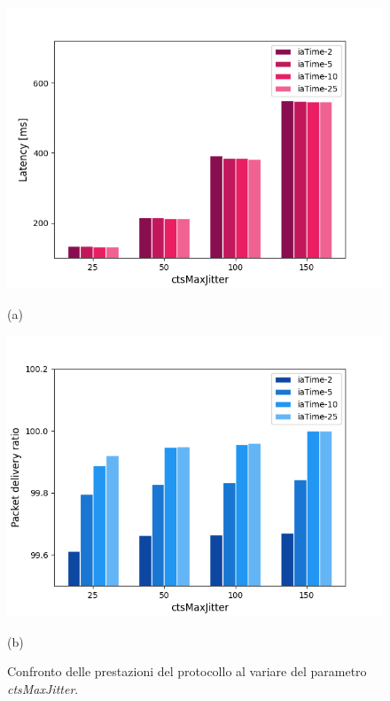 \documentclass[binding=0.6cm,TFA]{sapthesis}
\begin{document}
\begin{figure}[h]
    \centering
    \begin{minipage}{.5\textwidth}
        \centering
        \includegraphics[width=1\linewidth]{latency_jitter_comparison_plot.png}
        \caption*{(a)}
    \end{minipage}%
    \begin{minipage}{.5\textwidth}
        \centering
        \includegraphics[width=1\linewidth]{pdr_jitter_comparison_plot.png}
        \caption*{(b)}
    \end{minipage}
    \caption{Confronto delle prestazioni del protocollo al variare del parametro \emph{ctsMaxJitter}.}
\end{figure}
\end{document}
